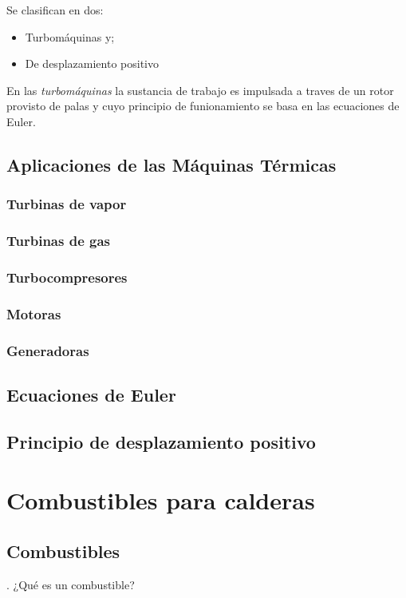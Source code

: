 \documentclass[11pt,a4paper]{article}
\begin{document}
	Se clasifican en dos: 
	\begin{itemize}
		\item Turbomáquinas y;
		\item De desplazamiento positivo
	\end{itemize}
	
	En las \textsl{turbomáquinas} la sustancia de trabajo es impulsada a traves de un rotor provisto de palas y cuyo principio de funionamiento se basa en las ecuaciones de Euler. 	
	
	\subsection{Aplicaciones de las Máquinas Térmicas}
	\subsubsection{Turbinas de vapor}
	\subsubsection{Turbinas de gas}
	\subsubsection{Turbocompresores}
	\subsubsection{Motoras}
	\subsubsection{Generadoras}
	
	\subsection{Ecuaciones de Euler}
	\subsection{Principio de desplazamiento positivo}
	
	\section{Combustibles para calderas}
	\subsection{Combustibles}
	
	\begin{preguntas}
		. ¿Qué es un combustible?
	\end{preguntas}
	
	
	
\end{document}
